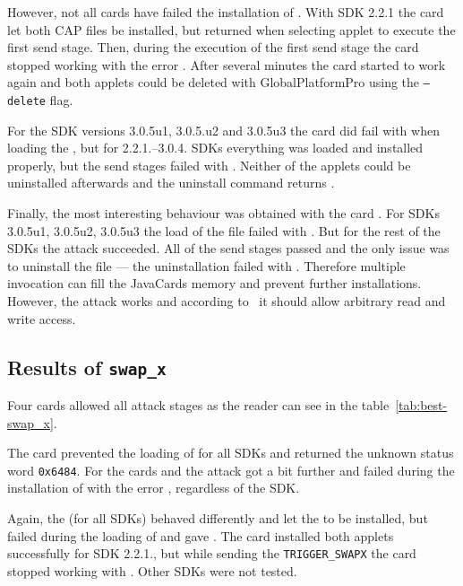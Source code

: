 \documentclass{../llncs/llncs}
\begin{document}
            However, not all cards have failed the installation of \vulnscap. With SDK 2.2.1 the card \Dcard let both CAP files be installed, but returned \swclanotsupported when selecting applet to execute the first send stage. Then, during the execution of the first send stage the card stopped working with the error \scardenottransacted. After several minutes the card started to work again and both applets could be deleted with GlobalPlatformPro using the \texttt{--delete} flag.

            For the SDK versions 3.0.5u1, 3.0.5.u2 and 3.0.5u3 the card \Acard did fail with \swwrongdata when loading the \appletscap, but for 2.2.1.--3.0.4. SDKs everything was loaded and installed properly, but the send stages failed with \swunknown. Neither of the applets could be uninstalled afterwards and the uninstall command returns \swconditionsnotsatisfied.

            Finally, the most interesting behaviour was obtained with the card \Jcard. For SDKs 3.0.5u1, 3.0.5u2, 3.0.5u3 the load of the file \appletscap failed with \jerror. But for the rest of the SDKs the attack succeeded. All of the send stages passed and the only issue was to uninstall the \appletscap file --- the uninstallation failed with \swconditionsnotsatisfied. Therefore multiple invocation can fill the JavaCards memory and prevent further installations. However, the attack works and according to~\cite{se:oracle:part1} it should allow arbitrary read and write access.


        \subsection{Results of \texttt{swap_x}}\label{subsec:swapx}

            Four cards allowed all attack stages as the reader can see in the table~\ref{tab:best-swap_x}.

            The card \Gcard prevented the loading of \vulnscap for all SDKs and returned the unknown status word \texttt{0x6484}. For the cards \Ccard and \Icard the attack got a bit further and failed during the installation of \vulnscap with the error \shortswconditionsnotsatisfied, regardless of the SDK.

            Again, the \Cnewcard (for all SDKs) behaved differently and let the \vulnscap to be installed, but failed during the loading of \appletscap and gave \shortswconditionsnotsatisfied. The card \Acard installed both applets successfully for SDK 2.2.1., but while sending the \texttt{TRIGGER_SWAPX} the card stopped working with \scardwunpoweredcard. Other SDKs were not tested.
\end{document}
